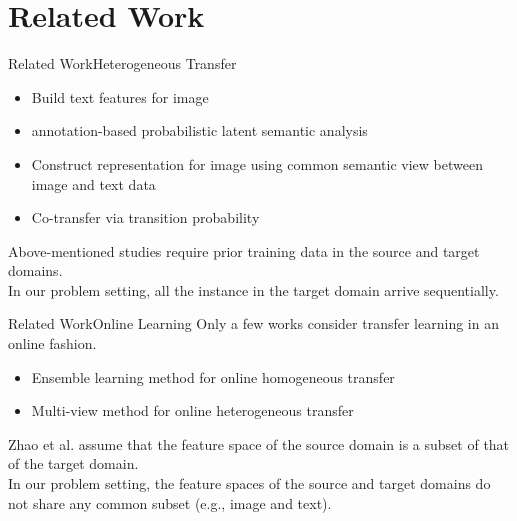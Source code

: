 \documentclass{beamer}
\begin{document}
\section{Related Work}
\begin{frame}{Related Work}{Heterogeneous Transfer}
\begin{itemize}
\item
Build text features for image \cite{wang2009building}
\item
annotation-based probabilistic latent semantic analysis \cite{yang2009heterogeneous}
\item
Construct representation for image using common semantic view between image and text data \cite{zhu2011heterogeneous}
\item
Co-transfer via transition probability \cite{ng2012co,wu2014co} 
\end{itemize}
Above-mentioned studies require prior training data in the source and target domains.
\\
In our problem setting, all the instance in the target domain arrive sequentially.
\end{frame}

\begin{frame}{Related Work}{Online Learning}
Only a few works consider transfer learning in an online fashion.
\begin{itemize}
\item
Ensemble learning method for online homogeneous transfer \cite{zhao2010otl,zhao2014online} 
\item
Multi-view method for online heterogeneous transfer 
\end{itemize}
Zhao et al. assume that the feature space of the source domain is a subset of that of the target domain.
\\
In our problem setting, the feature spaces of the source and target domains do not share any common subset (e.g., image and text).
\end{frame}
\end{document}
